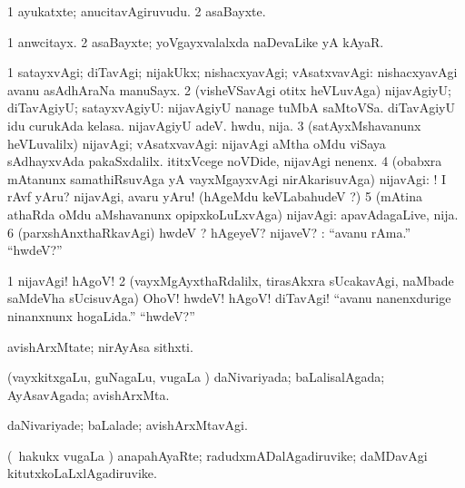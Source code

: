 \bentry
{}
\gl{\nA}
\bmng
\bnum
\num{1} ayukatxte; anucitavAgiruvudu. 
\num{2} asaBayxte. 
\enum
\emng
\eentry

\bentry
{}
\gl{\nA}
\bmng
\bnum
\num{1} anwcitayx. 
\num{2} asaBayxte; yoVgayxvalalxda naDevaLike yA kAyaR. 
\enum
\emng
\eentry

\bentry
{}
\gl{\kirxvi}
\bmng
\bnum
\num{1} satayxvAgi; diTavAgi; nijakUkx; nishacxyavAgi; vAsatxvavAgi:  nishacxyavAgi avanu asAdhAraNa manuSayx. 
\num{2} (visheVSavAgi otitx heVLuvAga) nijavAgiyU; diTavAgiyU; satayxvAgiyU:  nijavAgiyU nanage tuMbA saMtoVSa.  diTavAgiyU idu curukAda kelasa.  nijavAgiyU adeV.  hwdu, nija. 
\num{3} (satAyxMshavanunx heVLuvalilx) nijavAgi; vAsatxvavAgi:  nijavAgi aMtha oMdu viSaya sAdhayxvAda pakaSxdalilx.  ititxVcege noVDide, nijavAgi nenenx. 
\num{4} (obabxra mAtanunx samathiRsuvAga yA vayxMgayxvAgi nirAkarisuvAga) nijavAgi: ! I rAvf yAru? nijavAgi, avaru yAru! (hAgeMdu keVLabahudeV ?) 
\num{5} (mAtina athaRda oMdu aMshavanunx opipxkoLuLxvAga) nijavAgi:  apavAdagaLive, nija. 
\num{6} (parxshAnxthaRkavAgi) hwdeV ? hAgeyeV? nijaveV? :  ``avanu rAma.'' ``hwdeV?'' 
\enum
\emng
\eentry

\bentry
{}
\gl{\BAavayx}
\bmng
\bnum
\num{1} nijavAgi! hAgoV! 
\num{2} (vayxMgAyxthaRdalilx, tirasAkxra sUcakavAgi, naMbade saMdeVha sUcisuvAga) OhoV! hwdeV! hAgoV! diTavAgi!  ``avanu nanenxdurige ninanxnunx hogaLida.'' ``hwdeV?'' 
\enum
\emng
\eentry

\bentry
{}
\gl{\nA}
\bmng
avishArxMtate; nirAyAsa sithxti. 
\emng
\eentry

\bentry
{}
\gl{\gu}
\bmng
(vayxkitxgaLu, guNagaLu, \mo vugaLa \vi) daNivariyada; baLalisalAgada; AyAsavAgada; avishArxMta. 
\emng
\eentry

\bentry
{}
\gl{\kirxvi}
\bmng
daNivariyade; baLalade; avishArxMtavAgi. 
\emng
\eentry

\bentry
{}
\gl{\nA}
\bmng
(\kanmu\ hakukx \mo vugaLa \vi) anapahAyaRte; radudxmADalAgadiruvike; daMDavAgi kitutxkoLaLxlAgadiruvike. 
\emng
\eentry

